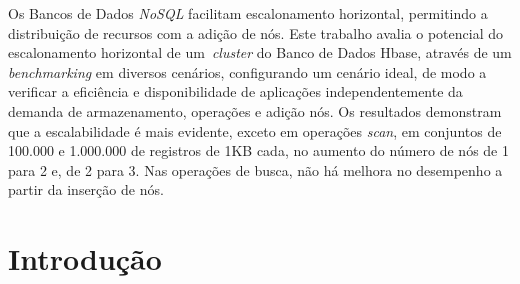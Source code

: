 \documentclass[12pt]{article}
\begin{document}
\begin{resumo} 
Os Bancos de Dados \emph{NoSQL} facilitam escalonamento horizontal, permitindo a distribuição de recursos com a adição de nós. Este trabalho avalia o potencial do escalonamento horizontal de um~\emph{cluster} do Banco de Dados Hbase, através de um \emph{benchmarking} em diversos cenários, configurando um cenário ideal, de modo a verificar a eficiência e disponibilidade de aplicações independentemente da demanda de armazenamento, operações e adição nós. Os resultados demonstram que a escalabilidade é mais evidente, exceto em operações \emph{scan}, em conjuntos de 100.000 e 1.000.000 de registros de 1KB cada, no aumento do número de nós de 1 para 2 e, de 2 para 3. Nas operações de busca, não há melhora no desempenho a partir da inserção de nós.
\end{resumo}


\section{Introdução}
\label{sec:introducao}
\end{document}
